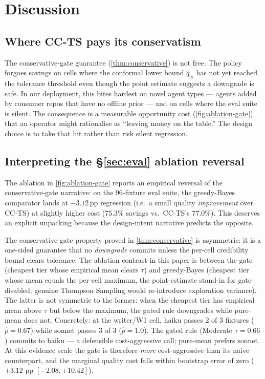 \section{Discussion}
\label{sec:discussion}

\subsection{Where CC-TS pays its conservatism}

The conservative-gate guarantee (\cref{thm:conservative}) is not free. The
policy forgoes savings on cells where the conformal lower bound
$\widehat{q}_{\mathrm{lo}}$ has not yet reached the tolerance threshold
even though the point estimate suggests a downgrade is safe. In our
deployment, this bites hardest on novel agent types --- agents added by
consumer repos that have no offline prior --- and on cells where the eval
suite is silent. The consequence is a measurable opportunity cost
(\cref{fig:ablation-gate}) that an operator might rationalise as
``leaving money on the table.'' The design choice is to take that hit
rather than risk silent regression.

\subsection{Interpreting the \texorpdfstring{\S\ref{sec:eval}}{Sec.~6} ablation reversal}
\label{sec:ablation-interp}

The ablation in \cref{fig:ablation-gate} reports an empirical reversal of
the conservative-gate narrative: on the $96$-fixture eval suite, the
greedy-Bayes comparator lands at $-3.12\,\mathrm{pp}$ regression (i.e.\ a
small quality \emph{improvement} over CC-TS) at slightly higher cost
($75.3\%$ savings vs.\ CC-TS's $77.0\%$). This deserves an explicit
unpacking because the design-intent narrative predicts the opposite.

The conservative-gate property proved in \cref{thm:conservative} is
asymmetric: it is a one-sided guarantee that no \emph{downgrade} commits
unless the per-cell credibility bound clears tolerance. The ablation
contrast in this paper is between the gate (cheapest tier whose
empirical mean clears $\tau$) and greedy-Bayes (cheapest tier whose mean equals the per-cell
maximum, the point-estimate stand-in for gate-disabled; genuine
Thompson Sampling would re-introduce exploration variance). The latter is not symmetric to
the former: when the cheapest tier has empirical mean above $\tau$ but
below the maximum, the gated rule downgrades while pure-mean does not.
Concretely: at the writer/W1 cell, haiku passes 2 of 3 fixtures
($\hat p = 0.67$) while sonnet passes 3 of 3 ($\hat p = 1.0$). The gated
rule (Moderate $\tau=0.66$) commits to haiku --- a defensible
cost-aggressive call; pure-mean prefers sonnet. At this evidence scale
the gate is therefore \emph{more} cost-aggressive than its naive
counterpart, and the marginal quality cost falls within bootstrap error
of zero ($+3.12$ pp $[-2.08, +10.42]$).

